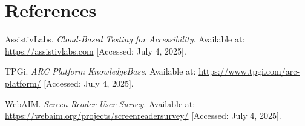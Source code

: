 \section{References}
\begin{thebibliography}{99}

 AssistivLabs. \textit{Cloud-Based Testing for Accessibility}. Available at: \url{https://assistivlabs.com} [Accessed: July 4, 2025].

 TPGi. \textit{ARC Platform KnowledgeBase}. Available at: \url{https://www.tpgi.com/arc-platform/} [Accessed: July 4, 2025].

 WebAIM. \textit{Screen Reader User Survey}. Available at: \url{https://webaim.org/projects/screenreadersurvey/} [Accessed: July 4, 2025].

\end{thebibliography}
